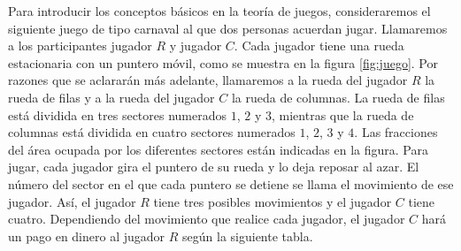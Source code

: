 Para introducir los conceptos básicos en la teoría de juegos, consideraremos el siguiente juego de tipo carnaval al que dos personas acuerdan jugar. Llamaremos a los participantes jugador $R$ y jugador $C$. Cada jugador tiene una rueda estacionaria con un puntero móvil, como se muestra en la figura \ref{fig:juego}. Por razones que se aclararán más adelante, llamaremos a la rueda del jugador $R$ la rueda de filas y a la rueda del jugador $C$ la rueda de columnas. La rueda de filas está dividida en tres sectores numerados $1$, $2$ y $3$, mientras que la rueda de columnas está dividida en cuatro sectores numerados $1$, $2$, $3$ y $4$. Las fracciones del área ocupada por los diferentes sectores están indicadas en la figura. Para jugar, cada jugador gira el puntero de su rueda y lo deja reposar al azar. El número del sector en el que cada puntero se detiene se llama el movimiento de ese jugador. Así, el jugador $R$ tiene tres posibles movimientos y el jugador $C$ tiene cuatro. Dependiendo del movimiento que realice cada jugador, el jugador $C$ hará un pago en dinero al jugador $R$ según la siguiente tabla.
